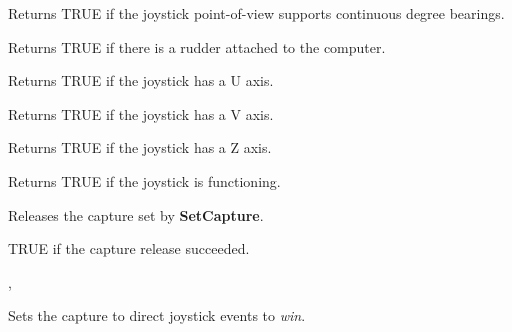 Returns TRUE if the joystick point-of-view supports continuous degree bearings.

\label{wxjoystickhasrudder}


Returns TRUE if there is a rudder attached to the computer.

\label{wxjoystickhasu}


Returns TRUE if the joystick has a U axis.

\label{wxjoystickhasv}


Returns TRUE if the joystick has a V axis.

\label{wxjoystickhasz}


Returns TRUE if the joystick has a Z axis.

\label{wxjoystickisok}


Returns TRUE if the joystick is functioning.

\label{wxjoystickreleasecapture}


Releases the capture set by {\bf SetCapture}.


TRUE if the capture release succeeded.


, 

\label{wxjoysticksetcapture}


Sets the capture to direct joystick events to {\it win}.




